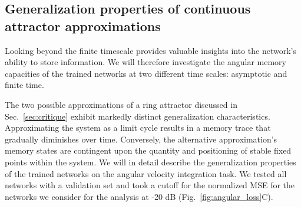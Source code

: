 \documentclass{article} %
\newcounter{ct}
\theoremstyle{definition}
\theoremstyle{remark}
\begin{document}
\subsection{Generalization properties of continuous attractor approximations}\label{sec:generalization}

Looking beyond the finite timescale provides valuable insights into the network's ability to store information.
We will therefore investigate the angular memory capacities of the trained networks at two different time scales:  asymptotic and finite time.

The two possible approximations of a ring attractor discussed in Sec.~\ref{sec:critique} exhibit markedly distinct generalization characteristics.
Approximating the system as a limit cycle results in a memory trace that gradually diminishes over time.
Conversely, the alternative approximation's memory states are contingent upon the quantity and positioning of stable fixed points within the system.
We will in detail describe the generalization properties of the trained networks on the angular velocity integration task.
We tested all networks with a validation set and took a cutoff for the normalized MSE for the networks we consider for the analysis at -20 dB (Fig.~\ref{fig:angular_loss}C).
\end{document}
